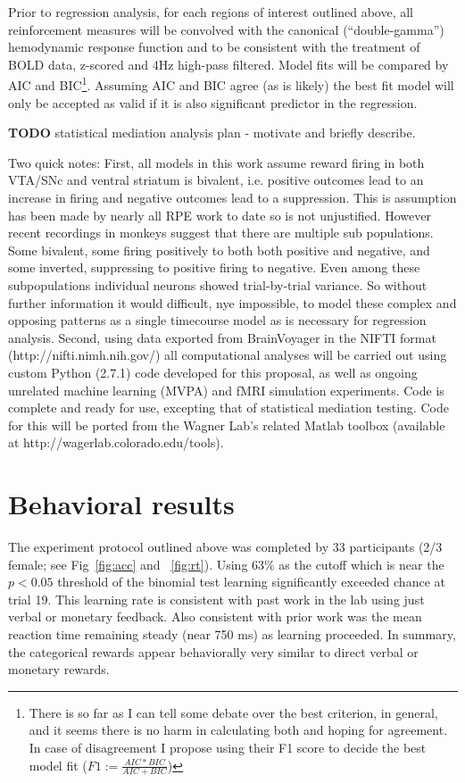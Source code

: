 \documentclass[doc,12pt]{apa}        %
\begin{document}
Prior to regression analysis, for each regions of interest outlined above, all reinforcement measures will be convolved with the canonical (``double-gamma'') hemodynamic response function and to be consistent with the treatment of BOLD data, z-scored and 4Hz high-pass filtered.  Model fits will be compared by AIC and BIC\footnote{There is so far as I can tell some debate over the best criterion, in general, and it seems there is no harm in calculating both and hoping for agreement.  In case of disagreement I propose using their F1 score to decide the best model fit ($F1 := \frac{AIC*BIC}{AIC+BIC}$) }. Assuming AIC and BIC agree (as is likely) the best fit model will only be accepted as valid if it is also significant predictor in the regression.

\textbf{TODO} statistical mediation analysis plan - motivate and briefly describe.

Two quick notes: First, all models in this work assume reward firing in both VTA/SNc and ventral striatum is bivalent, i.e. positive outcomes lead to an increase in firing and negative outcomes lead to a suppression.  This is assumption has been made by nearly all RPE work to date so is not unjustified.  However recent recordings in monkeys suggest that there are multiple sub populations.  Some bivalent, some firing positively to both both positive and negative, and some inverted, suppressing to positive firing to negative.  Even among these subpopulations individual neurons showed trial-by-trial variance.  So without further information it would difficult, nye impossible, to model these complex and opposing patterns as a single timecourse model as is necessary for regression analysis.  Second, using data exported from BrainVoyager in the NIFTI format (http://nifti.nimh.nih.gov/) all computational analyses will be carried out using custom Python (2.7.1) code developed for this proposal, as well as ongoing unrelated machine learning (MVPA) and fMRI simulation experiments.  Code is complete and ready for use, excepting that of statistical mediation testing.   Code for this will be ported from the Wagner Lab's related Matlab toolbox (available at http://wagerlab.colorado.edu/tools).

\section{Behavioral results} %
\label{sec:behavioral_results}
The experiment protocol outlined above was completed by 33 participants (2/3 female; see Fig~\ref{fig:acc} and ~\ref{fig:rt}).  Using 63\% as the cutoff which is near the $p < 0.05$ threshold of the binomial test learning significantly exceeded chance at trial 19.  This learning rate is consistent with past work in the lab using just verbal or monetary feedback.  Also consistent with prior work was the mean reaction time remaining steady (near 750 ms) as learning proceeded.  In summary, the categorical rewards appear behaviorally very similar to direct verbal or monetary rewards.
\end{document}
